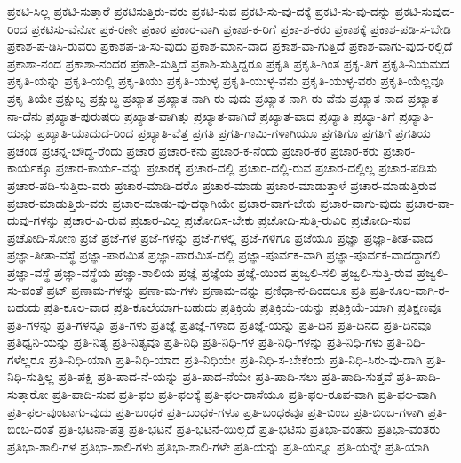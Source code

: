 {ಪ್ರಕಟಿ-ಸಿಲ್ಲ
ಪ್ರಕಟಿ-ಸುತ್ತಾರೆ
ಪ್ರಕಟಿಸುತ್ತಿರು-ವರು
ಪ್ರಕಟಿ-ಸುವ
ಪ್ರಕಟಿ-ಸು-ವು-ದಕ್ಕೆ
ಪ್ರಕಟಿ-ಸು-ವು-ದನ್ನು
ಪ್ರಕಟಿ-ಸುವುದ-ರಿಂದ
ಪ್ರಕಟಿಸು-ವೆನೋ
ಪ್ರಕ-ರಣೇ
ಪ್ರಕಾರ
ಪ್ರಕಾರ-ವಾಗಿ
ಪ್ರಕಾಶ-ಕ-ರಿಗೆ
ಪ್ರಕಾ-ಶ-ಕರು
ಪ್ರಕಾಶಕ್ಕೆ
ಪ್ರಕಾಶ-ಪಡಿ-ಸ-ಬೇಡಿ
ಪ್ರಕಾಶ-ಪ-ಡಿಸಿ-ರುವರು
ಪ್ರಕಾಶಪ-ಡಿ-ಸು-ವುದು
ಪ್ರಕಾಶ-ಮಾನ-ವಾದ
ಪ್ರಕಾಶ-ವಾ-ಗುತ್ತಿದೆ
ಪ್ರಕಾಶ-ವಾಗು-ವುದ-ರಲ್ಲಿದೆ
ಪ್ರಕಾಶಾ-ನಂದ
ಪ್ರಕಾಶಾ-ನಂದರ
ಪ್ರಕಾಶಿ-ಸುತ್ತಿದೆ
ಪ್ರಕಾಶಿ-ಸುತ್ತಿದ್ದರೂ
ಪ್ರಕೃತಿ
ಪ್ರಕೃತಿ-ಗಿಂತ
ಪ್ರಕೃ-ತಿಗೆ
ಪ್ರಕೃತಿ-ನಿಯಮದ
ಪ್ರಕೃತಿ-ಯನ್ನು
ಪ್ರಕೃತಿ-ಯಲ್ಲಿ
ಪ್ರಕೃ-ತಿಯು
ಪ್ರಕೃತಿ-ಯುಳ್ಳ
ಪ್ರಕೃತಿ-ಯುಳ್ಳ-ವನು
ಪ್ರಕೃತಿ-ಯುಳ್ಳ-ವರು
ಪ್ರಕೃತಿ-ಯೆಲ್ಲವೂ
ಪ್ರಕೃ-ತಿಯೇ
ಪ್ರಕ್ಷುಬ್ದ
ಪ್ರಕ್ಷುಬ್ಧ
ಪ್ರಖ್ಯಾತ
ಪ್ರಖ್ಯಾತ-ನಾಗಿ-ರು-ವುದು
ಪ್ರಖ್ಯಾತ-ನಾಗಿ-ರು-ವೆನು
ಪ್ರಖ್ಯಾತ-ನಾದ
ಪ್ರಖ್ಯಾತ-ನಾ-ದೆನು
ಪ್ರಖ್ಯಾತ-ಪುರುಷರು
ಪ್ರಖ್ಯಾತ-ವಾಗಿತ್ತು
ಪ್ರಖ್ಯಾತ-ವಾಗಿದೆ
ಪ್ರಖ್ಯಾತ-ವಾದ
ಪ್ರಖ್ಯಾತಿ
ಪ್ರಖ್ಯಾ-ತಿಗೆ
ಪ್ರಖ್ಯಾತಿ-ಯನ್ನು
ಪ್ರಖ್ಯಾತಿ-ಯಾದುದ-ರಿಂದ
ಪ್ರಖ್ಯಾತಿ-ವೆತ್ತ
ಪ್ರಗತಿ
ಪ್ರಗತಿ-ಗಾಮಿ-ಗಳಾಗಿಯೂ
ಪ್ರಗತಿಗೂ
ಪ್ರಗತಿಗೆ
ಪ್ರಗತಿಯ
ಪ್ರಚಂಡ
ಪ್ರಚನ್ನ-ಬೌದ್ಧ-ರೆಂದು
ಪ್ರಚಾರ
ಪ್ರಚಾರ-ಕನು
ಪ್ರಚಾರ-ಕ-ನೆಂದು
ಪ್ರಚಾರ-ಕರ
ಪ್ರಚಾರ-ಕರು
ಪ್ರಚಾರ-ಕಾರ್ಯಕ್ಕೂ
ಪ್ರಚಾರ-ಕಾರ್ಯ-ವನ್ನು
ಪ್ರಚಾರಕ್ಕೆ
ಪ್ರಚಾರ-ದಲ್ಲಿ
ಪ್ರಚಾರ-ದಲ್ಲಿ-ರುವ
ಪ್ರಚಾರ-ದಲ್ಲಿಲ್ಲ
ಪ್ರಚಾರ-ಪಡಿಸು
ಪ್ರಚಾರ-ಪಡಿ-ಸುತ್ತಿರು-ವರು
ಪ್ರಚಾರ-ಮಾಡಿ-ದರೊ
ಪ್ರಚಾರ-ಮಾಡು
ಪ್ರಚಾರ-ಮಾಡುತ್ತಾಳೆ
ಪ್ರಚಾರ-ಮಾಡುತ್ತಿರುವ
ಪ್ರಚಾರ-ಮಾಡುತ್ತಿರು-ವರು
ಪ್ರಚಾರ-ಮಾಡು-ವು-ದಕ್ಕಾಗಿಯೇ
ಪ್ರಚಾರ-ವಾಗ-ಬೇಕು
ಪ್ರಚಾರ-ವಾಗು-ವುದು
ಪ್ರಚಾರ-ವಾ-ದುವು-ಗಳನ್ನು
ಪ್ರಚಾರ-ವಿ-ರುವ
ಪ್ರಚಾರ-ವಿಲ್ಲ
ಪ್ರಚೋದಿಸ-ಬೇಕು
ಪ್ರಚೋದಿ-ಸುತ್ತಿ-ರುವಿರಿ
ಪ್ರಚೋದಿ-ಸುವ
ಪ್ರಚೋದಿ-ಸೋಣ
ಪ್ರಜೆ
ಪ್ರಜೆ-ಗಳ
ಪ್ರಜೆ-ಗಳನ್ನು
ಪ್ರಜೆ-ಗಳಲ್ಲಿ
ಪ್ರಜೆ-ಗಳಿಗೂ
ಪ್ರಜೆಯೂ
ಪ್ರಜ್ಞಾ
ಪ್ರಜ್ಞಾ-ತೀತ-ವಾದ
ಪ್ರಜ್ಞಾ-ತೀತಾ-ವಸ್ಥೆ
ಪ್ರಜ್ಞಾ-ಪಾರಮಿತ
ಪ್ರಜ್ಞಾ-ಪಾರಮಿತ-ದಲ್ಲಿ
ಪ್ರಜ್ಞಾ-ಪೂರ್ವಕ-ವಾಗಿ
ಪ್ರಜ್ಞಾ-ಪೂರ್ವಕ-ವಾದದ್ದಾಗಲಿ
ಪ್ರಜ್ಞಾ-ವಸ್ಥೆ
ಪ್ರಜ್ಞಾ-ವಸ್ಥೆಯ
ಪ್ರಜ್ಞಾ-ಶಾಲಿಯ
ಪ್ರಜ್ಞೆ
ಪ್ರಜ್ಞೆಯ
ಪ್ರಜ್ಞೆ-ಯಿಂದ
ಪ್ರಜ್ವಲಿ-ಸಲಿ
ಪ್ರಜ್ವಲಿ-ಸುತ್ತಿ-ರುವ
ಪ್ರಜ್ವಲಿ-ಸು-ವಂತೆ
ಪ್ರಟ್
ಪ್ರಣಾಮ-ಗಳನ್ನು
ಪ್ರಣಾ-ಮ-ಗಳು
ಪ್ರಣಾಮ-ವನ್ನು
ಪ್ರಣಿಧಾ-ನ-ದಿಂದಲೂ
ಪ್ರತಿ
ಪ್ರತಿ-ಕೂಲ-ವಾಗಿ-ರ-ಬಹುದು
ಪ್ರತಿ-ಕೂಲ-ವಾದ
ಪ್ರತಿ-ಕೂಲೆಯಾಗ-ಬಹುದು
ಪ್ರತಿಕ್ರಿಯೆ
ಪ್ರತಿಕ್ರಿಯೆ-ಯನ್ನು
ಪ್ರತಿಕ್ರಿಯೆ-ಯಾಗಿ
ಪ್ರತಿಕ್ಷಣವೂ
ಪ್ರತಿ-ಗಳನ್ನು
ಪ್ರತಿ-ಗಳನ್ನೂ
ಪ್ರತಿ-ಗಳು
ಪ್ರತಿಜ್ಞೆ
ಪ್ರತಿಜ್ಞೆ-ಗಳಾದ
ಪ್ರತಿಜ್ಞೆ-ಯನ್ನು
ಪ್ರತಿ-ದಿನ
ಪ್ರತಿ-ದಿನದ
ಪ್ರತಿ-ದಿನವೂ
ಪ್ರತಿಧ್ವನಿ-ಯನ್ನು
ಪ್ರತಿ-ನಿತ್ಯ
ಪ್ರತಿ-ನಿತ್ಯವೂ
ಪ್ರತಿ-ನಿಧಿ
ಪ್ರತಿ-ನಿಧಿ-ಗಳ
ಪ್ರತಿ-ನಿಧಿ-ಗಳನ್ನು
ಪ್ರತಿ-ನಿಧಿ-ಗಳು
ಪ್ರತಿ-ನಿಧಿ-ಗಳೆಲ್ಲರೂ
ಪ್ರತಿ-ನಿಧಿ-ಯಾಗಿ
ಪ್ರತಿ-ನಿಧಿ-ಯಾದ
ಪ್ರತಿ-ನಿಧಿಯೇ
ಪ್ರತಿ-ನಿಧಿ-ಸ-ಬೇಕೆಂದು
ಪ್ರತಿ-ನಿಧಿ-ಸಿರು-ವು-ದಾಗಿ
ಪ್ರತಿ-ನಿಧಿ-ಸುತ್ತಿಲ್ಲ
ಪ್ರತಿ-ಪಕ್ಷಿ
ಪ್ರತಿ-ಪಾದ-ನೆ-ಯನ್ನು
ಪ್ರತಿ-ಪಾದ-ನೆಯೇ
ಪ್ರತಿ-ಪಾದಿ-ಸಲು
ಪ್ರತಿ-ಪಾದಿ-ಸುತ್ತವೆ
ಪ್ರತಿ-ಪಾದಿ-ಸುತ್ತಾರೋ
ಪ್ರತಿ-ಪಾದಿ-ಸುವ
ಪ್ರತಿ-ಫಲ
ಪ್ರತಿ-ಫಲಕ್ಕೆ
ಪ್ರತಿ-ಫಲ-ದಾಸೆಯೂ
ಪ್ರತಿ-ಫಲ-ರೂಪ-ವಾಗಿ
ಪ್ರತಿ-ಫಲ-ವಾಗಿ
ಪ್ರತಿ-ಫಲ-ವುಂಟಾಗು-ವುದು
ಪ್ರತಿ-ಬಂಧಕ
ಪ್ರತಿ-ಬಂಧಕ-ಗಳೂ
ಪ್ರತಿ-ಬಂಧಕವೂ
ಪ್ರತಿ-ಬಿಂಬ
ಪ್ರತಿ-ಬಿಂಬ-ಗಳಾಗಿ
ಪ್ರತಿ-ಬಿಂಬ-ದಂತೆ
ಪ್ರತಿ-ಭಟನಾ-ಪತ್ರ
ಪ್ರತಿ-ಭಟನೆ
ಪ್ರತಿ-ಭಟನೆ-ಯಿಲ್ಲದೆ
ಪ್ರತಿ-ಭಟಿಸು
ಪ್ರತಿಭಾ-ವಂತನು
ಪ್ರತಿಭಾ-ವಂತರು
ಪ್ರತಿಭಾ-ಶಾಲಿ-ಗಳ
ಪ್ರತಿಭಾ-ಶಾಲಿ-ಗಳು
ಪ್ರತಿಭಾ-ಶಾಲಿ-ಗಳೇ
ಪ್ರತಿ-ಯನ್ನು
ಪ್ರತಿ-ಯನ್ನೂ
ಪ್ರತಿ-ಯನ್ನೇ
ಪ್ರತಿ-ಯಾಗಿ
}
